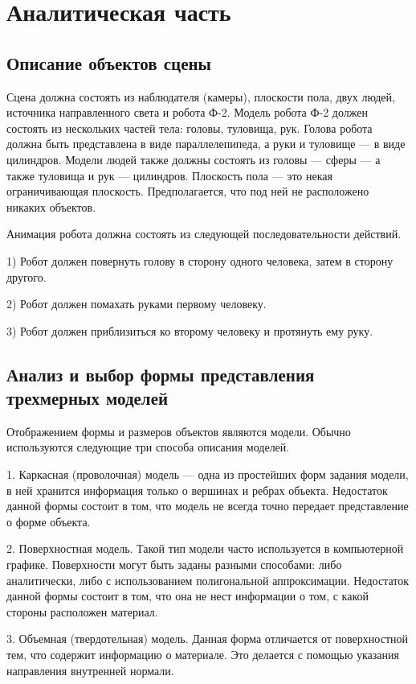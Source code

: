 
\chapter{Аналитическая часть}

	
	\section{Описание объектов сцены}
	
	Сцена должна состоять из наблюдателя (камеры), плоскости пола, двух людей, источника направленного света и робота Ф-2.
	Модель робота Ф-2 должен состоять из нескольких частей тела: головы, туловища, рук. Голова робота должна быть представлена в виде параллелепипеда, а руки и туловище --- в виде цилиндров.
	Модели людей также должны состоять из головы --- сферы --- а также туловища и рук --- цилиндров.
	Плоскость пола --– это некая ограничивающая плоскость. Предполагается, что под ней не расположено никаких объектов.
	
	Анимация робота должна состоять из следующей последовательности действий.
	
	1) Робот должен повернуть голову в сторону одного человека, затем в сторону другого. 
	
	2) Робот должен помахать руками первому человеку.
	
	3) Робот должен приблизиться ко второму человеку и протянуть ему руку.
	
	\section{Анализ и выбор формы представления трехмерных моделей}
	
	Отображением формы и размеров объектов являются модели. 
	Обычно используются следующие три способа описания моделей.
	
	1.	Каркасная (проволочная) модель --- одна из простейших форм задания модели, в ней хранится информация только о вершинах и ребрах объекта. Недостаток данной формы состоит в том, что модель не всегда точно передает представление о форме объекта.
	
	2.	Поверхностная модель.
	Такой тип модели часто используется в компьютерной графике. Поверхности могут быть заданы разными способами: либо аналитически, либо с использованием полигональной аппроксимации. Недостаток данной формы состоит в том, что она не нест информации о том, с какой стороны расположен материал.
	
	3.	Объемная (твердотельная) модель.
	Данная форма отличается от поверхностной тем, что содержит информацию о материале. Это делается с помощью указания направления внутренней нормали. 
	

